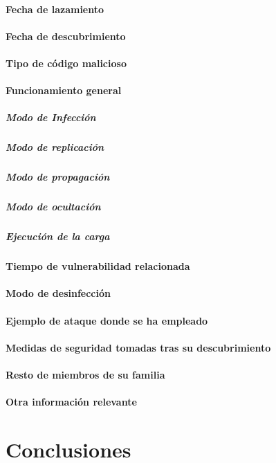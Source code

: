 \documentclass[11pt,a4paper]{article}
\begin{document}
\paragraph{Fecha de lazamiento}

\paragraph{Fecha de descubrimiento}

\paragraph{Tipo de código malicioso}

\paragraph{Funcionamiento general}

\subparagraph{Modo de Infección}

\subparagraph{Modo de replicación}

\subparagraph{Modo de propagación}

\subparagraph{Modo de ocultación}

\subparagraph{Ejecución de la carga}

\paragraph{Tiempo de vulnerabilidad relacionada}

\paragraph{Modo de desinfección}

\paragraph{Ejemplo de ataque donde se ha empleado}

\paragraph{Medidas de seguridad tomadas tras su descubrimiento}

\paragraph{Resto de miembros de su familia}

\paragraph{Otra información relevante}

\section{Conclusiones}
\label{sec:conclusiones}


\end{document}
